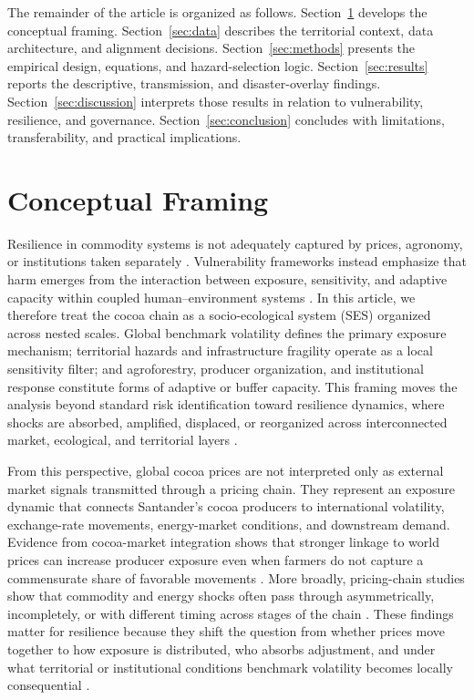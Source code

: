 \documentclass[11pt]{article}
\begin{document}
The remainder of the article is organized as follows. Section~\ref{sec:framing} develops the conceptual framing. Section~\ref{sec:data} describes the territorial context, data architecture, and alignment decisions. Section~\ref{sec:methods} presents the empirical design, equations, and hazard-selection logic. Section~\ref{sec:results} reports the descriptive, transmission, and disaster-overlay findings. Section~\ref{sec:discussion} interprets those results in relation to vulnerability, resilience, and governance. Section~\ref{sec:conclusion} concludes with limitations, transferability, and practical implications.

\section{Conceptual Framing}
\label{sec:framing}

Resilience in commodity systems is not adequately captured by prices, agronomy, or institutions taken separately \citep{Niether2020,Mechler2025}. Vulnerability frameworks instead emphasize that harm emerges from the interaction between exposure, sensitivity, and adaptive capacity within coupled human--environment systems \citep{Turner2003,Adger2006}. In this article, we therefore treat the cocoa chain as a socio-ecological system (SES) organized across nested scales. Global benchmark volatility defines the primary exposure mechanism; territorial hazards and infrastructure fragility operate as a local sensitivity filter; and agroforestry, producer organization, and institutional response constitute forms of adaptive or buffer capacity. This framing moves the analysis beyond standard risk identification toward resilience dynamics, where shocks are absorbed, amplified, displaced, or reorganized across interconnected market, ecological, and territorial layers \citep{Folke2006,GundersonHolling2002,Tendall2015,Zurek2022}.

From this perspective, global cocoa prices are not interpreted only as external market signals transmitted through a pricing chain. They represent an exposure dynamic that connects Santander's cocoa producers to international volatility, exchange-rate movements, energy-market conditions, and downstream demand. Evidence from cocoa-market integration shows that stronger linkage to world prices can increase producer exposure even when farmers do not capture a commensurate share of favorable movements \citep{TsowouGayi2019}. More broadly, pricing-chain studies show that commodity and energy shocks often pass through asymmetrically, incompletely, or with different timing across stages of the chain \citep{MeyerCramon2004,JimenezRodriguez2022}. These findings matter for resilience because they shift the question from whether prices move together to how exposure is distributed, who absorbs adjustment, and under what territorial or institutional conditions benchmark volatility becomes locally consequential \citep{Morales2022}.
\end{document}

